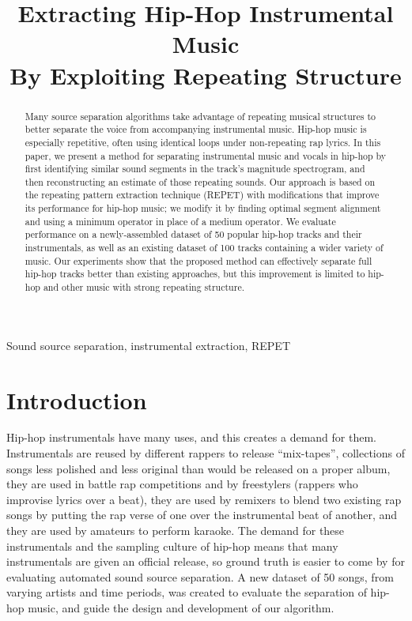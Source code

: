\documentclass{article}
\title{Extracting Hip-Hop Instrumental Music\\By Exploiting Repeating Structure}
\begin{document}
%
\maketitle
%
\begin{abstract}
Many source separation algorithms take advantage of repeating musical structures to better separate the voice from accompanying instrumental music. Hip-hop music is especially repetitive, often using identical loops under non-repeating rap lyrics. In this paper, we present a method for separating instrumental music and vocals in hip-hop by first identifying similar sound segments in the track's magnitude spectrogram, and then reconstructing an estimate of those repeating sounds. Our approach is based on the repeating pattern extraction technique (REPET) with modifications that improve its performance for hip-hop music; we modify it by finding optimal segment alignment and using a minimum operator in place of a medium operator. We evaluate performance on a newly-assembled dataset of 50 popular hip-hop tracks and their instrumentals, as well as an existing dataset of 100 tracks containing a wider variety of music.
Our experiments show that the proposed method can effectively separate full hip-hop tracks better than existing approaches, but this improvement is limited to hip-hop and other music with strong repeating structure. 
\end{abstract}
%
\begin{keywords}
Sound source separation, instrumental extraction, REPET
\end{keywords}
%
\section{Introduction}\label{sec:introduction}

Hip-hop instrumentals have many uses, and this creates a demand for them. Instrumentals are reused by different rappers to release ``mix-tapes'', collections of songs less polished and less original than would be released on a proper album, they are used in battle rap competitions and by freestylers (rappers who improvise lyrics over a beat), they are used by remixers to blend two existing rap songs by putting the rap verse of one over the instrumental beat of another, and they are used by amateurs to perform karaoke. The demand for these instrumentals and the sampling culture of hip-hop means that many instrumentals are given an official release, so ground truth is easier to come by for evaluating automated sound source separation. A new dataset of 50 songs, from varying artists and time periods, was created to evaluate the separation of hip-hop music, and guide the design and development of our algorithm. 
\end{document}
